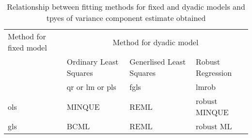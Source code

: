 %

\begin{table}[h]
\centering
\caption{Relationship between fitting methods for fixed and dyadic models and tpyes of variance component estimate obtained}
\label{tab:compest}
\vspace{0.1in}
\begin{tabular}{|p{1.0in}|p{1.0in}|p{1.0in}|p{1.0in}|} \hline
Method for fixed model  & \multicolumn{3}{c|}{Method for dyadic model} \\ \cline{2-4}
                        & Ordinary Least Squares & Generlised Least Squares & Robust Regression \\ 
                        & qr or lm or pls & fgls & lmrob \\ \hline

 ols & MINQUE & REML & robust MINQUE  \\
 gls & BCML   & REML & robust ML \\ \hline

 
\end{tabular}
\end{table}

%
